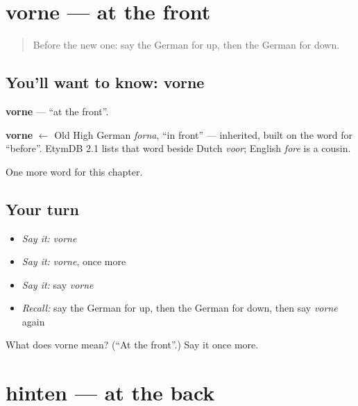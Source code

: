 \section[vorne]{vorne — at the front}

\label{lesson:GE-C109-vorne}



\begin{quote}
Before the new one: say the German for up, then the German for down.
\end{quote}

\subsection*{You'll want to know: vorne}
\textbf{vorne} — \textquotedblleft{}at the front\textquotedblright{}.

\begin{cousinweb}
\textbf{vorne} $\leftarrow$ Old High German \emph{forna}, \textquotedblleft{}in front\textquotedblright{} — inherited, built on the word for \textquotedblleft{}before\textquotedblright{}. EtymDB 2.1 lists that word beside Dutch \emph{voor}; English \emph{fore} is a cousin.
\end{cousinweb}

\begin{grammarlens}[title={What you've built}]
One more word for this chapter.
\end{grammarlens}

\subsection*{Your turn}
\begin{itemize}
\raggedright
  \item \emph{Say it:} \emph{vorne}
  \item \emph{Say it:} \emph{vorne}, once more
  \item \emph{Say it:} say \emph{vorne}
  \item \emph{Recall:} say the German for up, then the German for down, then say \emph{vorne} again
\end{itemize}

\begin{tcolorbox}[breakable,colback=teal!4,colframe=teal!35!black,title={Before you move on}]
What does vorne mean? (\textquotedblleft{}At the front\textquotedblright{}.) Say it once more.
\end{tcolorbox}
\section[hinten]{hinten — at the back}

